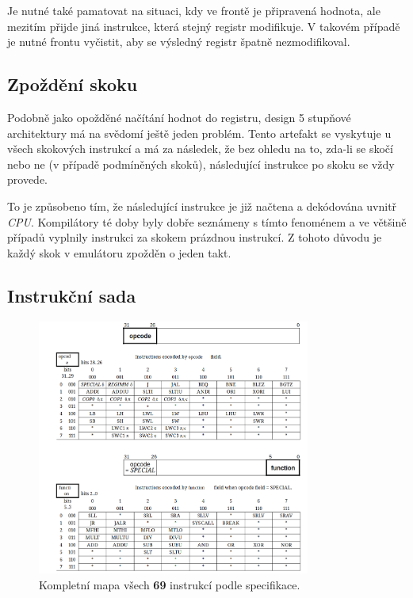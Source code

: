 Je nutné také pamatovat na situaci, kdy ve frontě je připravená hodnota, ale mezitím přijde jiná instrukce, 
která stejný registr modifikuje. V takovém případě je nutné frontu vyčistit, aby se výsledný registr špatně
nezmodifikoval.

\subsection{Zpoždění skoku}

Podobně jako opožděné načítání hodnot do registru, design 5 stupňové architektury má na svědomí ještě jeden problém.
Tento artefakt se vyskytuje u všech skokových instrukcí a má za následek, že bez ohledu na to, zda-li se skočí nebo ne 
(v případě podmíněných skoků), následující instrukce po skoku se vždy provede\cite{MIPSSpec}.

To je způsobeno tím, že následující instrukce je již načtena a dekódována uvnitř \textit{CPU}. 
Kompilátory té doby byly dobře seznámeny s tímto fenoménem a ve většině případů vyplnily instrukci za skokem prázdnou instrukcí. 
Z tohoto důvodu je každý skok v emulátoru zpožděn o jeden takt.

\subsection{Instrukční sada}

\begin{figure}[hbt]
	\centering
	\includegraphics[width=0.8\textwidth]{obrazky-figures/instruction-map.png}
	\caption{Kompletní mapa všech \textbf{69} instrukcí podle specifikace\cite{MIPSInsSpec}.}
	\label{instruction-map}
\end{figure}

